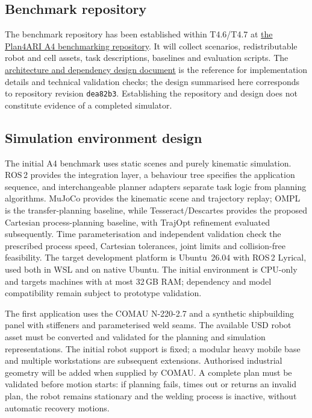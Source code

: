 \documentclass{plan4ari_report}
\begin{document}
\subsection{Benchmark repository}
The benchmark repository has been established within T4.6/T4.7 at \href{https://github.com/CNR-STIIMA-IRAS/plan4ari_a4_benchmarking}{the Plan4ARI A4 benchmarking repository}. It will collect scenarios, redistributable robot and cell assets, task descriptions, baselines and evaluation scripts. The \href{https://github.com/CNR-STIIMA-IRAS/plan4ari_a4_benchmarking/blob/master/docs/architecture.md}{architecture and dependency design document} is the reference for implementation details and technical validation checks; the design summarised here corresponds to repository revision \texttt{dea82b3}. Establishing the repository and design does not constitute evidence of a completed simulator.

\subsection{Simulation environment design}\label{sec:simenv}
The initial A4 benchmark uses static scenes and purely kinematic simulation. ROS\,2 provides the integration layer, a behaviour tree specifies the application sequence, and interchangeable planner adapters separate task logic from planning algorithms. MuJoCo provides the kinematic scene and trajectory replay; OMPL is the transfer-planning baseline, while Tesseract/Descartes provides the proposed Cartesian process-planning baseline, with TrajOpt refinement evaluated subsequently. Time parameterisation and independent validation check the prescribed process speed, Cartesian tolerances, joint limits and collision-free feasibility. The target development platform is Ubuntu~26.04 with ROS\,2 Lyrical, used both in WSL and on native Ubuntu. The initial environment is CPU-only and targets machines with at most 32\,GB RAM; dependency and model compatibility remain subject to prototype validation.

The first application uses the COMAU N-220-2.7 and a synthetic shipbuilding panel with stiffeners and parameterised weld seams. The available USD robot asset must be converted and validated for the planning and simulation representations. The initial robot support is fixed; a modular heavy mobile base and multiple workstations are subsequent extensions. Authorised industrial geometry will be added when supplied by COMAU. A complete plan must be validated before motion starts: if planning fails, times out or returns an invalid plan, the robot remains stationary and the welding process is inactive, without automatic recovery motions.
\end{document}
